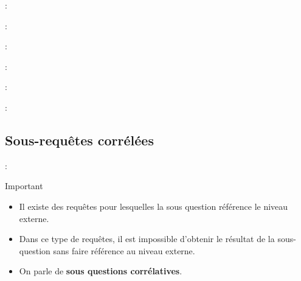\documentclass[10pt]{beamer}
\begin{document}
\begin{frame}{\secname : \subsecname}
    
\end{frame}

\begin{frame}{\secname : \subsecname}
    
\end{frame}

\begin{frame}{\secname : \subsecname}
    
\end{frame}

\begin{frame}{\secname : \subsecname}
    
\end{frame}

\begin{frame}{\secname : \subsecname}
    
\end{frame}

\begin{frame}{\secname : \subsecname}
    
\end{frame}

\subsection{Sous-requêtes corrélées}
\begin{frame}{\secname : \subsecname}
    \begin{alertblock}{Important}
        \begin{itemize}
            \item Il existe des requêtes pour lesquelles la sous question référence le niveau externe.
            \item Dans ce type de requêtes, il est impossible d'obtenir le résultat de la sous-question sans faire référence au niveau externe.
            \item On parle de \textbf{sous questions corrélatives}.
        \end{itemize}
    \end{alertblock}
\end{frame}
\end{document}
